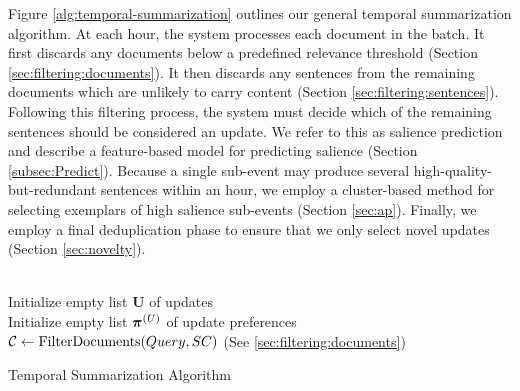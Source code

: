 
Figure \ref{alg:temporal-summarization} outlines our general temporal summarization algorithm.  At each hour, the system processes each document in the batch. It first discards any documents below a predefined relevance threshold (Section \ref{sec:filtering:documents}).  It then discards any sentences from the remaining documents which are unlikely to carry content (Section \ref{sec:filtering:sentences}).  Following this filtering process, the system must decide which of the remaining sentences should be considered an update.  We refer to this as salience prediction and describe a feature-based model for predicting salience (Section \ref{subsec:Predict}).  Because a single sub-event may produce several high-quality-but-redundant sentences within an hour, we employ a cluster-based method for selecting exemplars of high salience sub-events (Section \ref{sec:ap}).  Finally, we employ a final deduplication phase to ensure that we only select novel updates (Section \ref{sec:novelty}).

\begin{algorithm}%
 ~\\
 Initialize empty list $\mathbf{U}$ of updates\\
 Initialize empty list $\boldsymbol{\operatorname{\boldsymbol{\pi}}}^{(U)}$ of update preferences\\
 $\operatorname{\mathcal{C}} \gets \operatorname{FilterDocuments}(Query, SC)$ (See \cref{sec:filtering:documents})\\
 \caption{Temporal Summarization Algorithm}\label{alg:temporal-summarization}
\end{algorithm}
